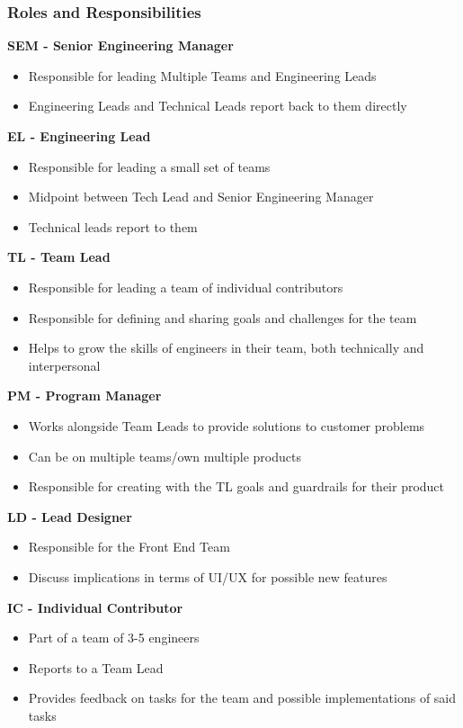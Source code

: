 \documentclass[11pt]{article} %
\begin{document}
\subsubsection{\textbf{Roles and Responsibilities}}

\textbf{SEM -  Senior Engineering Manager}
\begin{itemize}
	\item Responsible for leading Multiple Teams and Engineering Leads
	\item Engineering Leads and Technical Leads report back to them directly
\end{itemize}
\textbf{EL -  Engineering Lead}
\begin{itemize}
\item Responsible for leading a small set of teams
\item Midpoint between Tech Lead and Senior Engineering Manager
\item Technical leads report to them
\end{itemize}
\textbf{TL -  Team Lead}
\begin{itemize}
\item Responsible for leading a team of individual contributors
\item Responsible for defining and sharing goals and challenges for the team
\item Helps to grow the skills of engineers in their team, both technically and interpersonal
\end{itemize}
\textbf{PM -  Program Manager}
\begin{itemize}
\item Works alongside Team Leads to provide solutions to customer problems
\item Can be on multiple teams/own multiple products
\item Responsible for creating with the TL goals and guardrails for their product
\end{itemize}
\textbf{LD -  Lead Designer}
\begin{itemize}
\item Responsible for the Front End Team
\item Discuss implications in terms of UI/UX for possible new features
\end{itemize}
\textbf{IC -  Individual Contributor}
\begin{itemize}
\item Part of a team of 3-5 engineers
\item Reports to a Team Lead
\item Provides feedback on tasks for the team and possible implementations of said tasks
\end{itemize}
\end{document}
